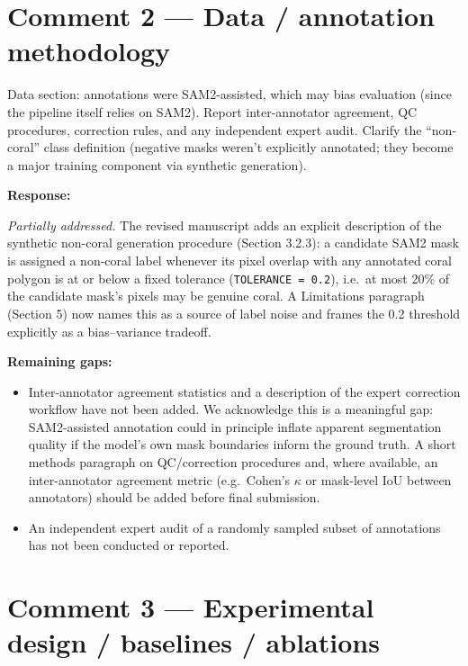 \documentclass[12pt]{article}
\newenvironment{reviewercomment}{%
  \begin{mdframed}[backgroundcolor=gray!10,linecolor=gray!40,
                   leftmargin=0pt,rightmargin=0pt,
                   innerleftmargin=8pt,innerrightmargin=8pt,
                   innertopmargin=6pt,innerbottommargin=6pt]
  \itshape\color{quotegray}%
}{%
  \end{mdframed}%
}
\newenvironment{response}{%
  \vspace{4pt}%
  \color{respblue}%
  \noindent\textbf{Response:}\space
}{%
  \vspace{10pt}%
}
\begin{document}
\section*{Comment 2 --- Data / annotation methodology}

\begin{reviewercomment}
Data section: annotations were SAM2-assisted, which may bias evaluation (since
the pipeline itself relies on SAM2).  Report inter-annotator agreement, QC
procedures, correction rules, and any independent expert audit.  Clarify the
``non-coral'' class definition (negative masks weren't explicitly annotated;
they become a major training component via synthetic generation).
\end{reviewercomment}

\begin{response}
\textit{Partially addressed.}  The revised manuscript adds an explicit
description of the synthetic non-coral generation procedure (Section 3.2.3):
a candidate SAM2 mask is assigned a non-coral label whenever its pixel overlap
with any annotated coral polygon is at or below a fixed tolerance
(\texttt{TOLERANCE = 0.2}), i.e.\ at most 20\% of the candidate mask's pixels
may be genuine coral.  A Limitations paragraph (Section 5) now names this as a
source of label noise and frames the 0.2 threshold explicitly as a
bias--variance tradeoff.

\textbf{Remaining gaps:}
\begin{itemize}[topsep=2pt,itemsep=2pt]
  \item Inter-annotator agreement statistics and a description of the expert
    correction workflow have not been added.  We acknowledge this is a
    meaningful gap: SAM2-assisted annotation could in principle inflate
    apparent segmentation quality if the model's own mask boundaries inform
    the ground truth.  A short methods paragraph on QC/correction procedures
    and, where available, an inter-annotator agreement metric (e.g.\
    Cohen's $\kappa$ or mask-level IoU between annotators) should be added
    before final submission.
  \item An independent expert audit of a randomly sampled subset of
    annotations has not been conducted or reported.
\end{itemize}
\end{response}

\section*{Comment 3 --- Experimental design / baselines / ablations}
\end{document}
